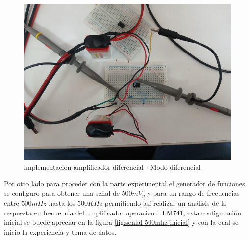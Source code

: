 \begin{figure}[h]
	\centering
	\includegraphics[width=0.5\linewidth]{media/imp-circuito-mod-diferencial}
	\caption{Implementación amplificador diferencial - Modo diferencial}
	\label{fig:imp-circuito-mod-diferencial}
\end{figure}

Por otro lado para proceder con la parte experimental el generador de funciones se configuro para obtener una señal de $500mV_p$ y para un rango de frecuencias entre $500mHz$ hasta los $500KHz$ permitiendo así realizar un análisis de la respuesta en frecuencia del amplificador operacional LM741, esta configuración inicial se puede apreciar en la figura \ref{fig:senial-500mhz-inicial} y con la cual se inicio la experiencia y toma de datos.

